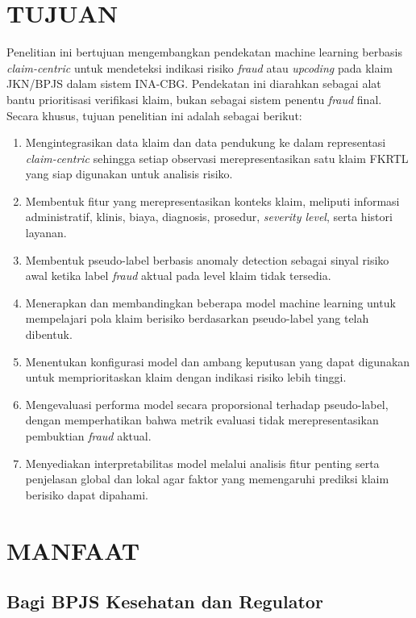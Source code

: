 \section{TUJUAN}

Penelitian ini bertujuan mengembangkan pendekatan machine learning berbasis \textit{claim-centric} untuk mendeteksi indikasi risiko \textit{fraud} atau \textit{upcoding} pada klaim JKN/BPJS dalam sistem INA-CBG. Pendekatan ini diarahkan sebagai alat bantu prioritisasi verifikasi klaim, bukan sebagai sistem penentu \textit{fraud} final. Secara khusus, tujuan penelitian ini adalah sebagai berikut:

\begin{enumerate}[label=\arabic*., leftmargin=*]
  \item Mengintegrasikan data klaim dan data pendukung ke dalam representasi \textit{claim-centric} sehingga setiap observasi merepresentasikan satu klaim FKRTL yang siap digunakan untuk analisis risiko.
  \item Membentuk fitur yang merepresentasikan konteks klaim, meliputi informasi administratif, klinis, biaya, diagnosis, prosedur, \textit{severity level}, serta histori layanan.
  \item Membentuk pseudo-label berbasis anomaly detection sebagai sinyal risiko awal ketika label \textit{fraud} aktual pada level klaim tidak tersedia.
  \item Menerapkan dan membandingkan beberapa model machine learning untuk mempelajari pola klaim berisiko berdasarkan pseudo-label yang telah dibentuk.
  \item Menentukan konfigurasi model dan ambang keputusan yang dapat digunakan untuk memprioritaskan klaim dengan indikasi risiko lebih tinggi.
  \item Mengevaluasi performa model secara proporsional terhadap pseudo-label, dengan memperhatikan bahwa metrik evaluasi tidak merepresentasikan pembuktian \textit{fraud} aktual.
  \item Menyediakan interpretabilitas model melalui analisis fitur penting serta penjelasan global dan lokal agar faktor yang memengaruhi prediksi klaim berisiko dapat dipahami.
\end{enumerate}

\section{MANFAAT}

\subsection{Bagi BPJS Kesehatan dan Regulator}

